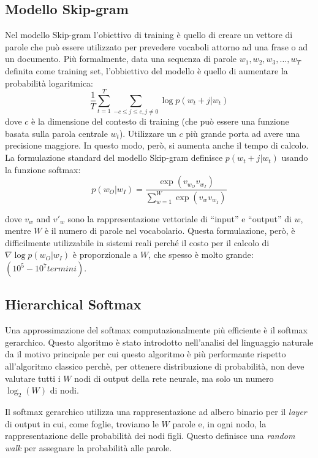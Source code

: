 \documentclass[a4paper,12pt,openright,twoside]{report}
\theoremstyle{definition}
\begin{document}
\subsection{Modello Skip-gram}
Nel modello Skip-gram l'obiettivo di training è quello di creare un vettore di parole che
può essere utilizzato per prevedere vocaboli attorno ad una frase o ad un documento. Più formalmente,
data una sequenza di parole $w_1,w_2,w_3,\ldots,w_T$ definita come training set, 
l'obbiettivo del modello è quello di aumentare la
probabilità logaritmica:
\begin{equation}
	\frac{1}{T} \sum_{t=1}^{T} \sum_{-c\leq j\leq c,j\neq0} \log p(w_t+j|w_t)
	\label{eq:prob log}
\end{equation}
dove $c$ è la dimensione del contesto di training (che può essere una funzione basata sulla parola centrale $w_t$).
Utilizzare un $c$ più grande porta ad avere una precisione maggiore. In questo modo, però, si aumenta anche il 
tempo di calcolo. La formulazione standard del modello Skip-gram definisce $p(w_t+j|w_t)$ usando la funzione
softmax:
\begin{equation}
	p(w_O|w_I) = \frac{\exp(v_{w_O} v_{w_I})}{\sum_{w=1}^{W}\exp(v_w v_{w_I})}
	\label{eq:softmax}
\end{equation}

dove $v_w$ and $v'_w$ sono la rappresentazione vettoriale di ``input'' e ``output'' di $w$, mentre $W$ è il numero
di parole nel vocabolario.
Questa formulazione, però, è difficilmente utilizzabile in sistemi reali
perché il costo per il calcolo di $\nabla\log p(w_O|w_I)$
è proporzionale a $W$, che spesso è molto grande: $(10^5-10^7 termini)$.

\subsection{Hierarchical Softmax}
Una approssimazione del softmax computazionalmente più efficiente è il softmax gerarchico. Questo algoritmo
è stato introdotto nell'analisi del linguaggio naturale da \cite{Fred2005}
il motivo principale
per cui questo algoritmo è più performante rispetto all'algoritmo classico
perchè, per ottenere distribuzione di probabilità, non deve valutare tutti i $W$
 nodi di output della rete neurale, ma solo un numero  $\log_2(W)$ di nodi.

Il softmax gerarchico utilizza una rappresentazione ad albero binario per il \emph{layer} di output 
in cui, come foglie,
troviamo le $W$ parole e, in ogni nodo, la rappresentazione delle probabilità dei nodi figli.
Questo definisce una \emph{random walk} per assegnare la probabilità alle parole.
\end{document}
